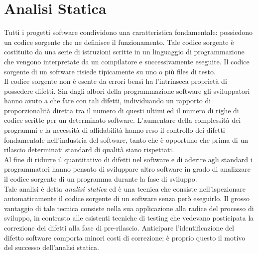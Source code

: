 \chapter{Analisi Statica}

\begin{epigraphs}
\end{epigraphs}

Tutti i progetti software condividono una caratteristica fondamentale: possiedono un codice sorgente che ne definisce il funzionamento. Tale codice sorgente è costituito da una serie di istruzioni scritte in un linguaggio di programmazione che vengono interpretate da un compilatore e successivamente eseguite. Il codice sorgente di un software risiede tipicamente su uno o più files di testo.\\
Il codice sorgente non è esente da errori bensì ha l'intrinseca proprietà di possedere difetti. Sin dagli albori della programmazione software gli sviluppatori hanno avuto a che fare con tali difetti, individuando un rapporto di proporzionalità diretta tra il numero di questi ultimi ed il numero di righe di codice scritte per un determinato software. L'aumentare della complessità dei programmi e la necessità di affidabilità hanno reso il controllo dei difetti fondamentale nell'industria del software, tanto che è opportuno che prima di un rilascio determinati standard di qualità siano rispettati. \\
Al fine di ridurre il quantitativo di difetti nel software e di aderire agli standard i programmatori hanno pensato di sviluppare altro software in grado di analizzare il codice sorgente di un programma durante la fase di sviluppo.\\
Tale analisi è detta \emph{analisi statica} ed è una tecnica che consiste nell'ispezionare automaticamente il codice sorgente di un software senza però eseguirlo. Il grosso vantaggio di tale tecnica consiste nella sua applicazione alla radice del processo di sviluppo, in contrasto alle esistenti tecniche di testing che vedevano posticipata la correzione dei difetti alla fase di pre-rilascio. Anticipare l'identificazione del difetto software comporta minori costi di correzione; è proprio questo il motivo del successo dell'analisi statica.

